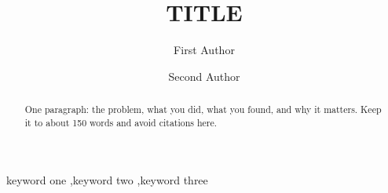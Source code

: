\documentclass[preprint,12pt]{elsarticle}
\begin{document}
\begin{frontmatter}

\title{{{TITLE}}}

\author[one]{First Author}
\author[two]{Second Author}


\begin{abstract}
One paragraph: the problem, what you did, what you found, and why it matters. Keep it to about 150 words and avoid citations here.
\end{abstract}

\begin{keyword}
keyword one \sep keyword two \sep keyword three
\end{keyword}

\end{frontmatter}






\end{document}
